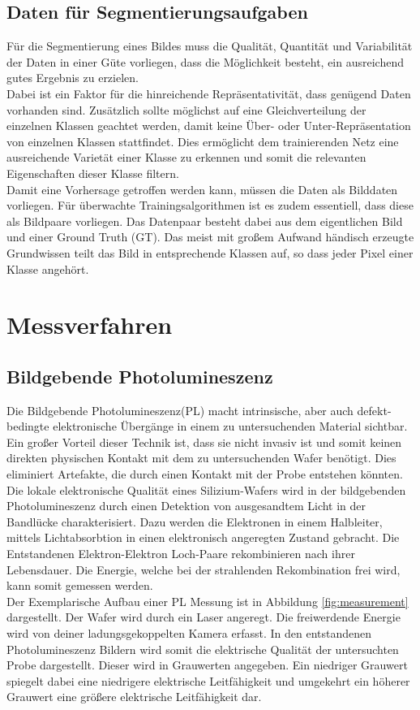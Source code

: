   \subsection*{Daten für Segmentierungsaufgaben}  
  Für die Segmentierung eines Bildes muss die Qualität, Quantität und Variabilität der Daten in einer Güte vorliegen, dass die Möglichkeit besteht, ein ausreichend gutes Ergebnis zu erzielen. \\
  Dabei ist ein Faktor für die hinreichende Repräsentativität, dass genügend Daten vorhanden sind. Zusätzlich sollte möglichst auf eine Gleichverteilung der einzelnen Klassen geachtet werden, damit keine Über- oder Unter-Repräsentation von einzelnen Klassen stattfindet. Dies ermöglicht dem trainierenden Netz eine ausreichende Varietät einer Klasse zu erkennen und somit die relevanten Eigenschaften dieser Klasse filtern.\\
  Damit eine Vorhersage getroffen werden kann, müssen die Daten als Bilddaten vorliegen. Für überwachte Trainingsalgorithmen ist es zudem essentiell, dass diese als Bildpaare vorliegen. Das Datenpaar besteht dabei aus dem eigentlichen Bild und einer Ground Truth (GT). Das meist mit großem Aufwand händisch erzeugte Grundwissen teilt das Bild in entsprechende Klassen auf, so dass jeder Pixel einer Klasse angehört.

  \section{Messverfahren}
  \subsection*{Bildgebende Photolumineszenz}
  Die Bildgebende Photolumineszenz(PL) macht intrinsische, aber auch defekt-bedingte elektronische Übergänge in einem zu untersuchenden Material sichtbar. Ein großer Vorteil dieser Technik ist, dass sie nicht invasiv ist und somit keinen direkten physischen Kontakt mit dem zu untersuchenden Wafer benötigt. Dies eliminiert Artefakte, die durch einen Kontakt mit der Probe entstehen könnten.\\
  Die lokale elektronische Qualität eines Silizium-Wafers wird in der bildgebenden Photolumineszenz durch einen Detektion von ausgesandtem Licht in der Bandlücke charakterisiert.\cite{PL_imaging_Trupke_Bardos_Schubert_Warta_2006} Dazu werden die Elektronen in einem Halbleiter, mittels Lichtabsorbtion in einen elektronisch angeregten Zustand gebracht. Die Entstandenen Elektron-Elektron Loch-Paare rekombinieren nach ihrer Lebensdauer. Die Energie, welche bei der strahlenden Rekombination frei wird, kann somit gemessen werden. \\
  Der Exemplarische Aufbau einer PL Messung ist in Abbildung \ref{fig:measurement} dargestellt. Der Wafer wird durch ein Laser angeregt. Die freiwerdende Energie wird von deiner ladungsgekoppelten Kamera erfasst. 
  In den entstandenen Photolumineszenz Bildern wird somit die elektrische Qualität der untersuchten Probe dargestellt. Dieser wird in Grauwerten angegeben. Ein niedriger Grauwert spiegelt dabei eine niedrigere elektrische Leitfähigkeit und umgekehrt ein höherer Grauwert eine größere elektrische Leitfähigkeit dar. \\

